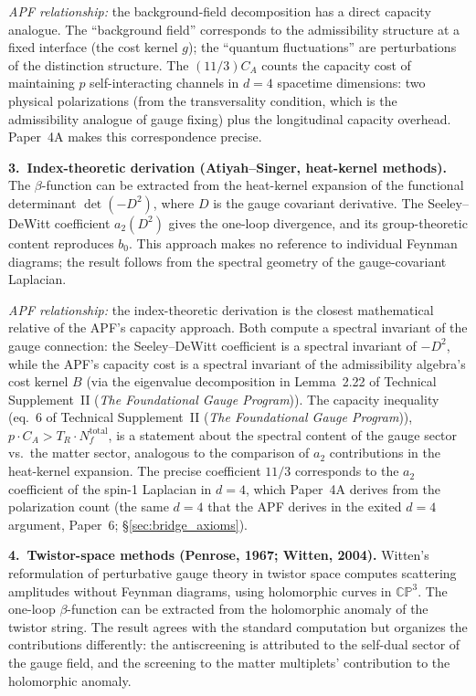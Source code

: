 \documentclass[11pt]{article}
\theoremstyle{definition}
\newcommand{\TSII}{Technical Supplement~II (\emph{The Foundational Gauge Program})}
\begin{document}
\textit{APF relationship:} the background-field decomposition has a
direct capacity analogue.  The ``background field'' corresponds to
the admissibility structure at a fixed interface (the cost kernel $g$);
the ``quantum fluctuations'' are perturbations of the distinction
structure.  The $(11/3)C_A$ counts the capacity cost of maintaining $p$
self-interacting channels in $d = 4$ spacetime dimensions: two
physical polarizations (from the transversality condition, which is
the admissibility analogue of gauge fixing) plus the longitudinal
capacity overhead.  Paper~4A makes this correspondence precise.

\smallskip\noindent\textbf{3.\ Index-theoretic derivation
(Atiyah--Singer, heat-kernel methods).}\quad
The $\beta$-function can be extracted from the heat-kernel expansion
of the functional determinant $\det(-D^2)$, where $D$ is the gauge
covariant derivative.  The Seeley--DeWitt coefficient $a_2(D^2)$
gives the one-loop divergence, and its group-theoretic content
reproduces $b_0$.  This approach makes no reference to individual
Feynman diagrams; the result follows from the spectral geometry of
the gauge-covariant Laplacian.

\textit{APF relationship:} the index-theoretic derivation is the
closest mathematical relative of the APF's capacity approach.  Both
compute a spectral invariant of the gauge connection: the
Seeley--DeWitt coefficient is a spectral invariant of $-D^2$, while
the APF's capacity cost is a spectral invariant of the admissibility
algebra's cost kernel $B$ (via the eigenvalue decomposition in
Lemma~2.22 of \TSII{}).  The capacity inequality
(eq.~6 of \TSII{}), $p \cdot C_A > T_R \cdot N_f^{\mathrm{total}}$,
is a statement about the spectral content of the gauge sector
vs.\ the matter sector, analogous to the comparison of
$a_2$ contributions in the heat-kernel expansion.  The precise
coefficient $11/3$ corresponds to the $a_2$ coefficient of the
spin-1 Laplacian in $d = 4$, which Paper~4A derives from
the polarization count (the same $d = 4$ that the APF derives in
the exited $d{=}4$ argument, Paper~6; \S\ref{sec:bridge_axioms}).

\smallskip\noindent\textbf{4.\ Twistor-space methods
(Penrose, 1967; Witten, 2004).}\quad
Witten's reformulation of perturbative gauge theory in twistor space
computes scattering amplitudes without Feynman diagrams, using
holomorphic curves in $\mathbb{CP}^3$.  The one-loop $\beta$-function
can be extracted from the holomorphic anomaly of the twistor string.
The result agrees with the standard computation but organizes the
contributions differently: the antiscreening is attributed to the
self-dual sector of the gauge field, and the screening to the
matter multiplets' contribution to the holomorphic anomaly.
\end{document}
